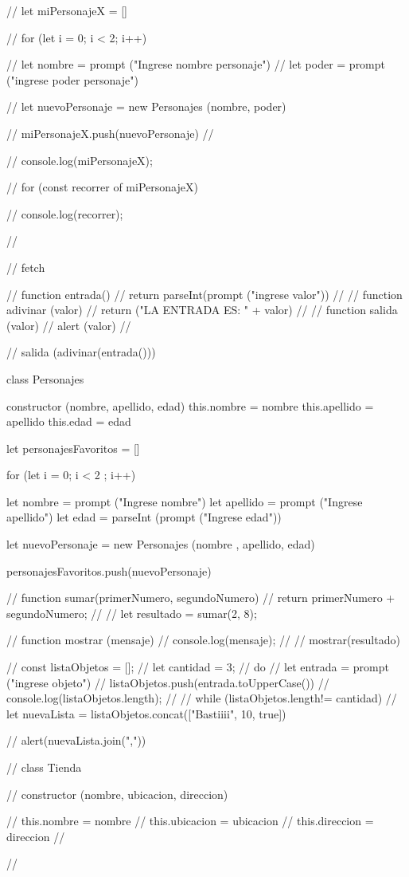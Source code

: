 // let miPersonajeX = []

// for (let i = 0; i < 2; i++) {

// let nombre = prompt ("Ingrese nombre personaje")
// let poder = prompt ("ingrese poder personaje")

// let nuevoPersonaje = new Personajes (nombre, poder)

// miPersonajeX.push(nuevoPersonaje)
// }

// console.log(miPersonajeX);

// for (const recorrer of miPersonajeX) {
// console.log(recorrer);

// }

// fetch

// function entrada() {
// return parseInt(prompt ("ingrese valor"))
// }
// function adivinar (valor) {
// return ("LA ENTRADA ES: " + valor)
// }
// function salida (valor) {
// alert (valor)
// }

// salida (adivinar(entrada()))

class Personajes {

    constructor (nombre, apellido, edad){
        this.nombre = nombre
        this.apellido = apellido
        this.edad = edad
    }

}

let personajesFavoritos = []

for (let i = 0; i < 2 ; i++) {

    let nombre = prompt ("Ingrese nombre")
    let apellido = prompt ("Ingrese apellido")
    let edad = parseInt (prompt ("Ingrese edad"))

    let nuevoPersonaje = new Personajes (nombre , apellido, edad)

    personajesFavoritos.push(nuevoPersonaje)

}

// function sumar(primerNumero, segundoNumero) {
// return primerNumero + segundoNumero;
// }
// let resultado = sumar(2, 8);

// function mostrar (mensaje) {
// console.log(mensaje);
// }
// mostrar(resultado)

// const listaObjetos = [];
// let cantidad = 3;
// do{
// let entrada = prompt ("ingrese objeto")
// listaObjetos.push(entrada.toUpperCase())
// console.log(listaObjetos.length);
// }
// while (listaObjetos.length!= cantidad)
// let nuevaLista = listaObjetos.concat(["Bastiiii", 10, true])

// alert(nuevaLista.join(",\n"))

// class Tienda {
// constructor (nombre, ubicacion, direccion){

// this.nombre = nombre
// this.ubicacion = ubicacion
// this.direccion = direccion
// }
// }

